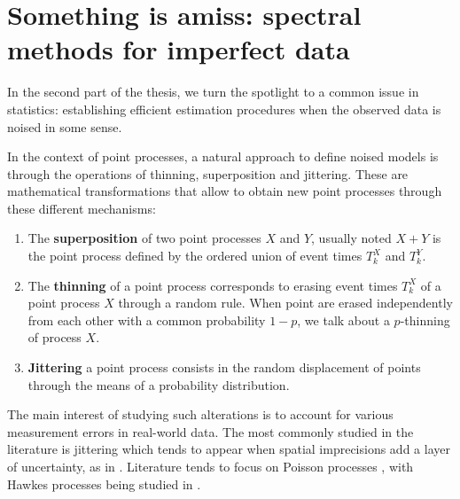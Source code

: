 


\section{Something is amiss: spectral methods for imperfect data}\label{sec:chap0_missing_data}
    
  In the second part of the thesis, we turn the spotlight to a common issue in statistics: 
  establishing efficient estimation procedures when the observed data is noised in some sense.

  In the context of point processes, a natural approach to define noised models is through the operations of thinning, superposition and jittering.
  These are mathematical transformations that allow to obtain new point processes through these different mechanisms:
  \begin{enumerate}
    \item The \textbf{superposition} of two point processes $X$ and $Y$, usually noted $X+Y$ is the point process defined by the ordered union of event times $T_k^X$ and $T_k^Y$.
    \item The \textbf{thinning} of a point process corresponds to erasing event times $T_k^X$ of a point process $X$ through a random rule.
    When point are erased independently from each other with a common probability $1-p$, we talk about a $p$-thinning of process $X$.
    \item \textbf{Jittering} a point process consists in the random displacement of points through the means of a probability distribution.
  \end{enumerate}

  The main interest of studying such alterations is to account for various measurement errors in real-world data. 
  The most commonly studied in the literature is jittering which tends to appear when spatial imprecisions add a layer of uncertainty, as in \parencite{Bonnet2022}. 
  Literature tends to focus on Poisson processes \parencite{Antoniadis2006, Hohage2016},
  with Hawkes processes being studied in \parencite{Trouleau2019, Deutsch2020}.

